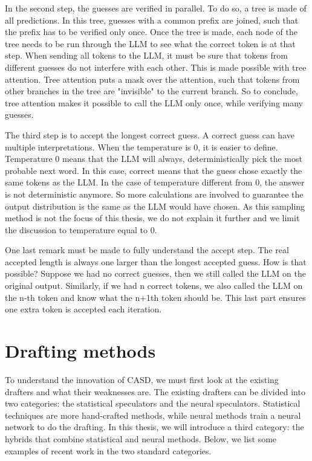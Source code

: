 In the second step, the guesses are verified in parallel. To do so, a tree is made of all predictions. In this tree, guesses with a common prefix are joined, such that the prefix has to be verified only once. Once the tree is made, each node of the tree needs to be run through the LLM to see what the correct token is at that step. When sending all tokens to the LLM, it must be sure that tokens from different guesses do not interfere with each other. This is made possible with tree attention. Tree attention puts a mask over the attention, such that tokens from other branches in the tree are "invisible" to the current branch. So to conclude, tree attention makes it possible to call the LLM only once, while verifying many guesses.

The third step is to accept the longest correct guess. A correct guess can have multiple interpretations. When the temperature is 0, it is easier to define. Temperature 0 means that the LLM will always, deterministically pick the most probable next word. In this case, correct means that the guess chose exactly the same tokens as the LLM. In the case of temperature different from 0, the answer is not deterministic anymore. So more calculations are involved to guarantee the output distribution is the same as the LLM would have chosen. As this sampling method is not the focus of this thesis, we do not explain it further and we limit the discussion to temperature equal to 0. 

One last remark must be made to fully understand the accept step. The real accepted length is always one larger than the longest accepted guess. How is that possible? Suppose we had no correct guesses, then we still called the LLM on the original output. Similarly, if we had n correct tokens, we also called the LLM on the n-th token and know what the n+1th token should be. This last part ensures one extra token is accepted each iteration.

\section{Drafting methods}
\label{sec:drafting_methods}
To understand the innovation of CASD, we must first look at the existing drafters and what their weaknesses are. The existing drafters can be divided into two categories: the statistical speculators and the neural speculators. Statistical techniques are more hand-crafted methods, while neural methods train a neural network to do the drafting. In this thesis, we will introduce a third category: the hybrids that combine statistical and neural methods. Below, we list some examples of recent work in the two standard categories.

